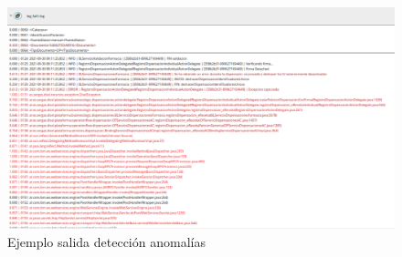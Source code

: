 \begin{figure}[H]
\centerline{\includegraphics[width=15cm]{figuras/report.png}}
\caption{Ejemplo salida detección anomalías}
\label{enlace1}
\end{figure}
